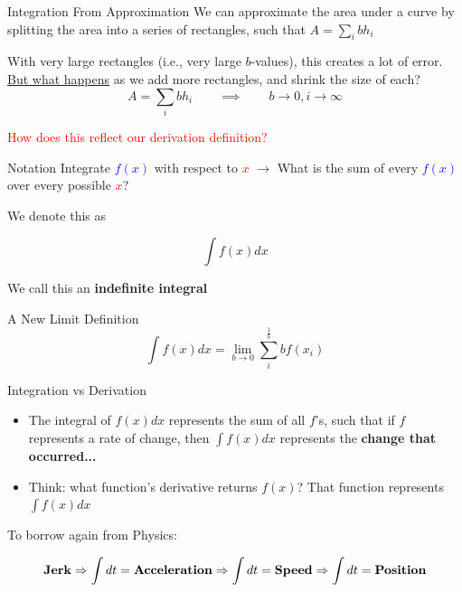 \documentclass[10pt]{beamer}
\begin{document}
\begin{frame}{Integration From Approximation}
    We can approximate the area under a curve by splitting the area into a series of rectangles, such that $A = \sum_i bh_i$ \\

    \vspace{.5cm}

    With very large rectangles (i.e., very large $b$-values), this creates a lot of error. \textcolor{purple}{\href{https://www.desmos.com/calculator/fgqivwklhm}{But what happens}} as we add more rectangles, and shrink the size of each? \\

    \[A=\sum_i bh_i \quad \quad \implies \quad \quad b \to 0, i \to \infty\]

    \textcolor{red}{How does this reflect our derivation definition?}
\end{frame}

\begin{frame}{Notation}
    Integrate \textcolor{blue}{$f(x)$} with respect to \textcolor{red}{$x$} $\rightarrow$ What is the sum of every \textcolor{blue}{$f(x)$} over every possible \textcolor{red}{$x$}? \\

    \vspace{.5cm}

    We denote this as

    \[\int f(x) dx\]

    We call this an \textbf{indefinite integral}
\end{frame}

\begin{frame}{A New Limit Definition}
    \[\int f(x) dx = \lim_{b \to 0} \sum_i^{\frac{1}{b}}b f(x_i)\]

\end{frame}

\begin{frame}{Integration vs Derivation}
    \begin{itemize}
        \item The integral of $f(x) dx$ represents the sum of all $f$'s, such that if $f$ represents a rate of change, then $\int f(x) dx$ represents the \textbf{change that occurred...}
        \item Think: what function's derivative returns $f(x)$? That function represents $\int f(x)dx$
    \end{itemize}

To borrow again from Physics:

\[\text{\textbf{Jerk}} \Rightarrow \int{dt} = \text{\textbf{Acceleration}} \Rightarrow \int{dt} = \text{\textbf{Speed}} \Rightarrow \int dt = \text{\textbf{Position}}\]

\end{frame}
\end{document}
